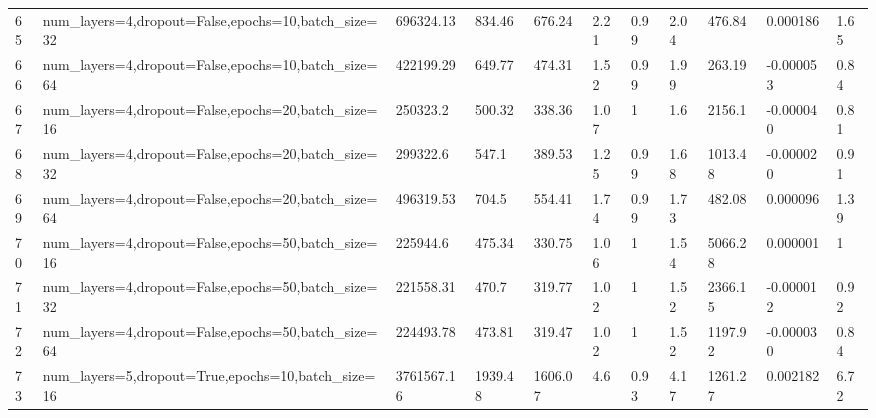 \begin{longtable}{C{0.8cm} L{2cm} C{1.15cm} C{1.15cm} C{1.15cm} C{1.15cm} C{0.85cm} C{1.25cm} C{1.2cm} C{1.5cm} C{1.0cm}}
65 & num\_layers=4,\newline dropout=False,\newline epochs=10,\newline batch\_size=32 & 696324.13 & 834.46 & 676.24 & 2.21 & 0.99 & 2.04 & 476.84 & 0.000186 & 1.65 \\
66 & num\_layers=4,\newline dropout=False,\newline epochs=10,\newline batch\_size=64 & 422199.29 & 649.77 & 474.31 & 1.52 & 0.99 & 1.99 & 263.19 & -0.000053 & 0.84 \\
67 & num\_layers=4,\newline dropout=False,\newline epochs=20,\newline batch\_size=16 & 250323.2 & 500.32 & 338.36 & 1.07 & 1 & 1.6 & 2156.1 & -0.000040 & 0.81 \\
68 & num\_layers=4,\newline dropout=False,\newline epochs=20,\newline batch\_size=32 & 299322.6 & 547.1 & 389.53 & 1.25 & 0.99 & 1.68 & 1013.48 & -0.000020 & 0.91 \\
69 & num\_layers=4,\newline dropout=False,\newline epochs=20,\newline batch\_size=64 & 496319.53 & 704.5 & 554.41 & 1.74 & 0.99 & 1.73 & 482.08 & 0.000096 & 1.39 \\
70 & num\_layers=4,\newline dropout=False,\newline epochs=50,\newline batch\_size=16 & 225944.6 & 475.34 & 330.75 & 1.06 & 1 & 1.54 & 5066.28 & 0.000001 & 1 \\
71 & num\_layers=4,\newline dropout=False,\newline epochs=50,\newline batch\_size=32 & 221558.31 & 470.7 & 319.77 & 1.02 & 1 & 1.52 & 2366.15 & -0.000012 & 0.92 \\
72 & num\_layers=4,\newline dropout=False,\newline epochs=50,\newline batch\_size=64 & 224493.78 & 473.81 & 319.47 & 1.02 & 1 & 1.52 & 1197.92 & -0.000030 & 0.84 \\
73 & num\_layers=5,\newline dropout=True,\newline epochs=10,\newline batch\_size=16 & 3761567.16 & 1939.48 & 1606.07 & 4.6 & 0.93 & 4.17 & 1261.27 & 0.002182 & 6.72 \\

\end{longtable}
